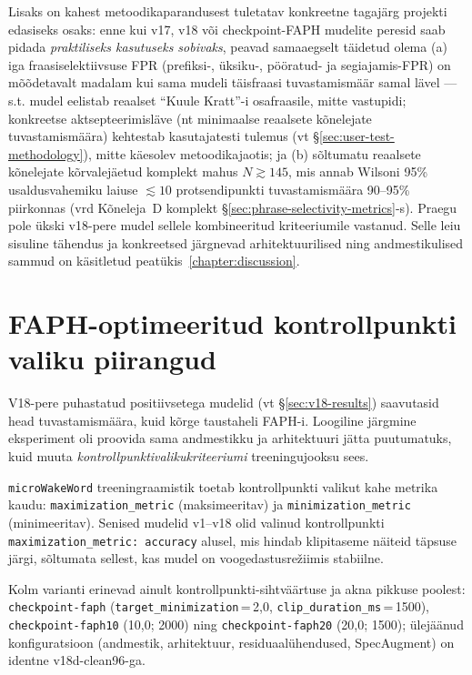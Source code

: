Lisaks on kahest metoodikaparandusest tuletatav konkreetne tagajärg projekti edasiseks osaks: enne kui v17, v18 või checkpoint-FAPH mudelite peresid saab pidada \emph{praktiliseks kasutuseks sobivaks}, peavad samaaegselt täidetud olema (a) iga fraasiselektiivsuse FPR (prefiksi-, üksiku-, pööratud- ja segiajamis-FPR) on mõõdetavalt madalam kui sama mudeli täisfraasi tuvastamismäär samal lävel --- s.t. mudel eelistab reaalset \enquote{Kuule Kratt}-i osafraasile, mitte vastupidi; konkreetse aktsepteerimisläve (nt minimaalse reaalsete kõnelejate tuvastamismäära) kehtestab kasutajatesti tulemus (vt §\ref{sec:user-test-methodology}), mitte käesolev metoodikajaotis; ja (b) sõltumatu reaalsete kõnelejate kõrvalejäetud komplekt mahus $N \gtrsim 145$, mis annab Wilsoni 95\% usaldusvahemiku laiuse $\lesssim 10$ protsendipunkti tuvastamismäära 90--95\% piirkonnas (vrd Kõneleja~D komplekt §\ref{sec:phrase-selectivity-metrics}-s). Praegu pole ükski v18-pere mudel sellele kombineeritud kriteeriumile vastanud. Selle leiu sisuline tähendus ja konkreetsed järgnevad arhitektuurilised ning andmestikulised sammud on käsitletud peatükis~\ref{chapter:discussion}.

\section{FAPH-optimeeritud kontrollpunkti valiku piirangud}
\label{sec:checkpoint-objective-control}

V18-pere puhastatud positiivsetega mudelid (vt §\ref{sec:v18-results}) saavutasid head tuvastamismäära, kuid kõrge taustaheli FAPH-i. Loogiline järgmine eksperiment oli proovida sama andmestikku ja arhitektuuri jätta puutumatuks, kuid muuta \emph{kontrollpunktivalikukriteeriumi} treeningujooksu sees.

\texttt{microWakeWord} treeningraamistik toetab kontrollpunkti valikut kahe metrika kaudu: \texttt{maximization\_metric} (maksimeeritav) ja \texttt{minimization\_metric} (minimeeritav). Senised mudelid v1--v18 olid valinud kontrollpunkti \texttt{maximization\_metric: accuracy} alusel, mis hindab klipitaseme näiteid täpsuse järgi, sõltumata sellest, kas mudel on voogedastusrežiimis stabiilne.

Kolm varianti erinevad ainult kontrollpunkti-sihtväärtuse ja akna pikkuse poolest: \texttt{checkpoint-faph} (\texttt{target\_minimization}\,=\,2{,}0, \texttt{clip\_duration\_ms}\,=\,1500), \texttt{checkpoint-faph10} (10{,}0; 2000) ning \texttt{checkpoint-faph20} (20{,}0; 1500); ülejäänud konfiguratsioon (andmestik, arhitektuur, residuaalühendused, SpecAugment) on identne v18d-clean96-ga.

